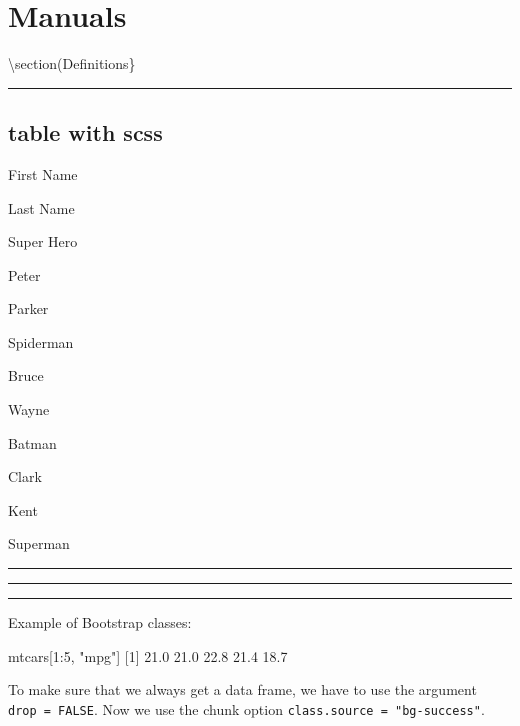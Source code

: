 \documentclass[
]{report}
\newenvironment{Shaded}{\begin{snugshade}}{\end{snugshade}}
\newcommand{\DecValTok}[1]{\textcolor[rgb]{0.68,0.00,0.00}{#1}}
\newcommand{\FloatTok}[1]{\textcolor[rgb]{0.68,0.00,0.00}{#1}}
\newcommand{\NormalTok}[1]{\textcolor[rgb]{0.00,0.23,0.31}{#1}}
\newcommand{\SpecialCharTok}[1]{\textcolor[rgb]{0.37,0.37,0.37}{#1}}
\newcommand{\StringTok}[1]{\textcolor[rgb]{0.13,0.47,0.30}{#1}}
\begin{document}
\section{Manuals}

\textbackslash section(Definitions\}

\begin{center}\rule{0.5\linewidth}{0.5pt}\end{center}

\subsection{table with scss}\label{table-with-scss}

First Name

Last Name

Super Hero

Peter

Parker

Spiderman

Bruce

Wayne

Batman

Clark

Kent

Superman

\begin{center}\rule{0.5\linewidth}{0.5pt}\end{center}

\begin{center}\rule{0.5\linewidth}{0.5pt}\end{center}

\begin{center}\rule{0.5\linewidth}{0.5pt}\end{center}

Example of Bootstrap classes:

\begin{Shaded}
\begin{Highlighting}[]
\NormalTok{mtcars[}\DecValTok{1}\SpecialCharTok{:}\DecValTok{5}\NormalTok{, }\StringTok{"mpg"}\NormalTok{]}
\NormalTok{[}\DecValTok{1}\NormalTok{] }\FloatTok{21.0} \FloatTok{21.0} \FloatTok{22.8} \FloatTok{21.4} \FloatTok{18.7}
\end{Highlighting}
\end{Shaded}

To make sure that we always get a data frame, we have to use the
argument \texttt{drop\ =\ FALSE}. Now we use the chunk option
\texttt{class.source\ =\ "bg-success"}.
\end{document}
